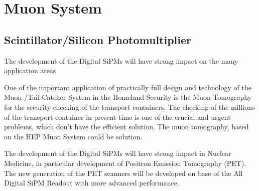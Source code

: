 \section{Muon System}
\subsection{Scintillator/Silicon Photomultiplier}
The development of the Digital SiPMs will have strong impact on the many application areas

One of the important application of practically full design and technology of the Muon /Tail Catcher System in the Homeland Security is the Muon Tomography for the security checking of the transport containers. The checking of the millions of the transport container in present time is one of the crucial and urgent problems, which don't have the efficient solution. The muon tomography, based on the HEP Muon System could be solution.

The development of the Digital SiPMs will have strong impact in Nuclear Medicine, in particular development of  Positron Emission Tomography (PET).  The new generation of the PET scanners will be developed on base of the All Digital SiPM Readout with more advanced performance.
